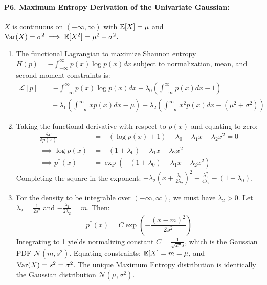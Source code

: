 \paragraph{P6. Maximum Entropy Derivation of the Univariate Gaussian:}
$X$ is continuous on $(-\infty, \infty)$ with $\operatorname{\mathbb{E}}[X] = \mu$ and $\operatorname{Var}(X) = \sigma^2 \implies \operatorname{\mathbb{E}}[X^2] = \mu^2 + \sigma^2$.
\begin{enumerate}[label=(\alph*)]
    \item The functional Lagrangian to maximize Shannon entropy $H(p) = -\int_{-\infty}^\infty p(x)\log p(x) dx$ subject to normalization, mean, and second moment constraints is:
    \begin{align*}
    \mathcal{L}[p] &= -\int_{-\infty}^\infty p(x)\log p(x) dx - \lambda_0 \left(\int_{-\infty}^\infty p(x) dx - 1\right) \\
    &\quad - \lambda_1 \left(\int_{-\infty}^\infty x p(x) dx - \mu\right) - \lambda_2 \left(\int_{-\infty}^\infty x^2 p(x) dx - (\mu^2 + \sigma^2)\right)
    \end{align*}
    \item Taking the functional derivative with respect to $p(x)$ and equating to zero:
    \begin{align*}
    \frac{\delta \mathcal{L}}{\delta p(x)} &= -(\log p(x) + 1) - \lambda_0 - \lambda_1 x - \lambda_2 x^2 = 0 \\
    \implies \log p(x) &= -(1 + \lambda_0) - \lambda_1 x - \lambda_2 x^2 \\
    \implies p^*(x) &= \exp\left( -(1 + \lambda_0) - \lambda_1 x - \lambda_2 x^2 \right)
    \end{align*}
    Completing the square in the exponent: $-\lambda_2\left(x + \frac{\lambda_1}{2\lambda_2}\right)^2 + \frac{\lambda_1^2}{4\lambda_2} - (1 + \lambda_0)$.
    \item For the density to be integrable over $(-\infty, \infty)$, we must have $\lambda_2 > 0$. Let $\lambda_2 = \frac{1}{2s^2}$ and $-\frac{\lambda_1}{2\lambda_2} = m$. Then:
    \begin{equation*}
    p^*(x) = C \exp\left( -\frac{(x - m)^2}{2s^2} \right)
    \end{equation*}
    Integrating to 1 yields normalizing constant $C = \frac{1}{\sqrt{2\pi}s}$, which is the Gaussian PDF $\mathcal{N}(m, s^2)$.
    Equating constraints:
    $\operatorname{\mathbb{E}}[X] = m = \mu$, and $\operatorname{Var}(X) = s^2 = \sigma^2$.
    The unique Maximum Entropy distribution is identically the Gaussian distribution $\mathcal{N}(\mu, \sigma^2)$.
\end{enumerate}

